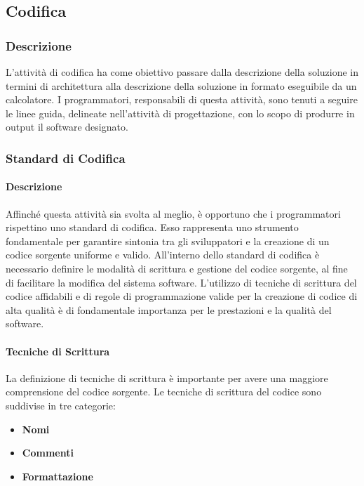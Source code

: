 \subsection{Codifica}

\subsubsection{Descrizione}
L'attività di codifica ha come obiettivo passare dalla descrizione della soluzione in termini di architettura alla descrizione della soluzione in formato eseguibile da un calcolatore. I programmatori, responsabili di questa attività, sono tenuti a seguire le linee guida, delineate nell'attività di progettazione, con lo scopo di produrre in output il software designato. 

\subsubsection{Standard di Codifica}
\paragraph{Descrizione}
Affinché questa attività sia svolta al meglio, è opportuno che i programmatori rispettino uno standard di codifica.
Esso rappresenta uno strumento fondamentale per garantire sintonia tra gli sviluppatori e la creazione di un codice sorgente uniforme e valido.
All'interno dello standard di codifica è necessario definire le modalità di scrittura e gestione del codice sorgente, al fine di facilitare la modifica del sistema software.
L'utilizzo di tecniche di scrittura del codice affidabili e di regole di programmazione valide per la creazione di codice di alta qualità è di fondamentale importanza per le prestazioni e la qualità del software. 


\paragraph{Tecniche di Scrittura}
La definizione di tecniche di scrittura è importante per avere una maggiore comprensione del codice sorgente.
Le tecniche di scrittura del codice sono suddivise in tre categorie:
\begin{itemize} 
\item
\textbf{Nomi}
\item
\textbf{Commenti}
\item
\textbf{Formattazione}
\end{itemize}

